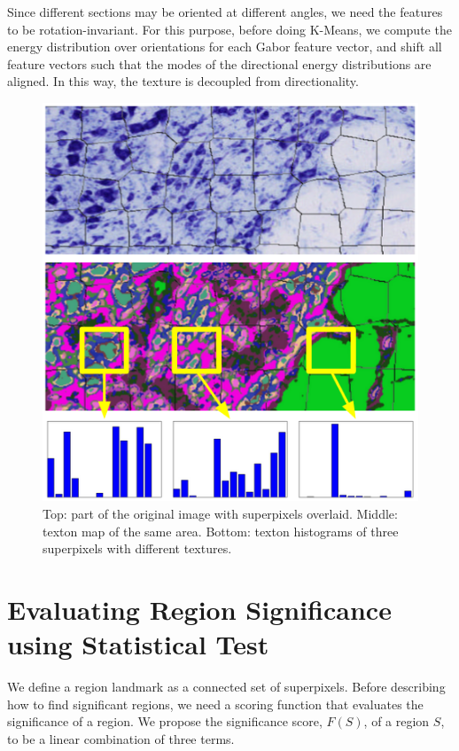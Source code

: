 \documentclass{llncs}
\begin{document}
Since different sections may be oriented at different angles, 
we need the features to be rotation-invariant. For this purpose, before doing K-Means, we compute the energy distribution over orientations for each Gabor feature vector, and shift all feature vectors such that the modes of the directional energy distributions are aligned. In this way, the texture is decoupled from directionality.

\begin{figure}
	\includegraphics[width=.5\textwidth]{../figures/TextonHistComparisonWithArrows.png}
	\caption{Top: part of the original image with superpixels overlaid. Middle: texton map of the same area. Bottom: texton histograms of three superpixels with different textures.}
	\label{fig:TextonHistComparison}
\end{figure}


\section{Evaluating Region Significance using Statistical Test}

We define a region landmark as a connected set of superpixels. Before describing how to find significant regions, we need a scoring function that evaluates the significance of a region. We propose the significance score, $F(S)$, of a region $S$, to be a linear combination of three terms. 
\end{document}
